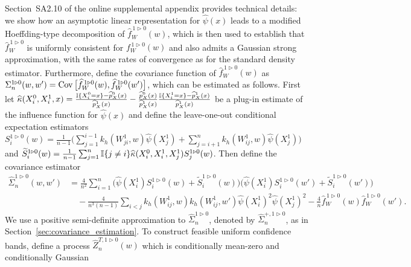 Section~SA2.10 of the online supplemental appendix provides technical details:
we show how an asymptotic
linear representation for $\widehat\psi(x)$ leads to a
modified Hoeffding-type decomposition of
$\widehat f_W^{\,1 \triangleright 0}(w)$,
which is then used to establish that $\widehat f_W^{\,1 \triangleright 0}$
is uniformly consistent for $f_W^{\,1 \triangleright 0}(w)$
and also admits a Gaussian strong approximation,
with the same rates of convergence
as for the standard density estimator.
Furthermore, define the covariance function of
$\widehat f_W^{\,1 \triangleright 0}(w)$ as
$\Sigma_n^{1 \triangleright 0}(w,w') = \operatorname{Cov}\big[
\widehat f_W^{\,1 \triangleright 0}(w),
\widehat f_W^{\,1 \triangleright 0}(w') \big]$,
which can be estimated as follows.
First let
$\widehat\kappa(X_i^0, X_i^1, x)
= \frac{\mathbb{I}\{X_i^0 = x\} - \widehat p_X^0(x)}{\widehat p_X^1(x)}
- \frac{\widehat p_X^0(x)}{\widehat p_X^1(x)} \frac{\mathbb{I}\{X_i^1 = x\} - \widehat
  p_X^1(x)}{\widehat p_X^1(x)}$
be a plug-in estimate of the influence function for $\widehat\psi(x)$
and define the leave-one-out
conditional expectation estimators\newline
$S_i^{1 \triangleright 0}(w)
= \frac{1}{n-1} \big( \sum_{j=1}^{i-1} k_h(W_{j i}^1,w) \widehat\psi(X_j^1)
+ \sum_{j=i+1}^n k_h(W_{ij}^1,w) \widehat\psi(X_j^1) \big)$
and\newline
$\widetilde S_i^{1 \triangleright 0}(w)
= \frac{1}{n-1} \sum_{j=1}^n \mathbb{I}\{j \neq i\}
\widehat\kappa(X_i^0, X_i^1, X_j^1) S_j^{1 \triangleright 0}(w)$.
Then define the covariance estimator
%
\begin{align*}
  \widehat\Sigma_n^{1 \triangleright 0}(w,w')
  &=
  \frac{4}{n^2}
  \sum_{i=1}^n
  \big(
  \widehat\psi(X_i^1)
  S_i^{1 \triangleright 0}(w)
  + \widetilde S_i^{1 \triangleright 0}(w)
  \big)
  \big(
  \widehat\psi(X_i^1)
  S_i^{1 \triangleright 0}(w')
  + \widetilde S_i^{1 \triangleright 0}(w')
  \big) \\
  &\quad-
  \frac{4}{n^3(n-1)}
  \sum_{i<j}
  k_h(W_{ij}^1, w)
  k_h(W_{ij}^1, w')
  \widehat\psi(X_i^1)^2
  \widehat\psi(X_j^1)^2
  - \frac{4}{n}
  \widehat f_W^{\,1 \triangleright 0}(w)
  \widehat f_W^{\,1 \triangleright 0}(w').
\end{align*}
%
We use a positive semi-definite approximation to
$\widehat\Sigma_n^{1 \triangleright 0}$, denoted by
$\widehat\Sigma_n^{+, 1 \triangleright 0}$,
as in Section~\ref{sec:covariance_estimation}.
To construct feasible uniform confidence bands,
define a process $\widehat Z_n^{T, 1 \triangleright 0}(w)$ which
is conditionally mean-zero and conditionally Gaussian
